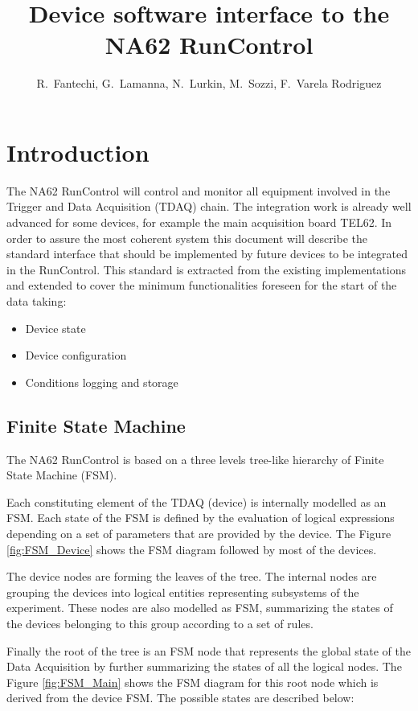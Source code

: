 \documentclass[a4paper]{article}
\title{Device software interface to the NA62 RunControl}
\author{R.~Fantechi, G.~Lamanna, N.~Lurkin, M.~Sozzi, F.~Varela Rodriguez}
\begin{document}
\maketitle

\linenumbers

\section{Introduction}
The NA62 RunControl will control and monitor all equipment involved in the Trigger and Data
Acquisition (TDAQ) chain. The integration work is already well advanced for some devices, for
example the main acquisition board TEL62\cite{biblio:TEL62}. In order to assure the most coherent system this
document will describe the standard interface that should be implemented by future devices to be
integrated in the RunControl. This standard is extracted from the existing implementations and
extended to cover the minimum functionalities foreseen for the start of the data taking:
\begin{itemize}
	\item Device state
	\item Device configuration
	\item Conditions logging and storage
\end{itemize} 

\subsection{Finite State Machine}\label{sec:FSM}
The NA62 RunControl is based on a three levels tree-like hierarchy of Finite State Machine (FSM).

Each constituting element of the TDAQ (device) is internally modelled as an FSM. Each state of the
FSM is defined by the evaluation of logical expressions depending on a set of parameters that are
provided by the device. The Figure \ref{fig:FSM_Device} shows the FSM diagram followed by most of
the devices.

The device nodes are forming the leaves of the tree. The internal nodes are grouping the devices
into logical entities representing subsystems of the experiment. These nodes are also modelled as
FSM, summarizing the states of the devices belonging to this group according to a set of rules.

Finally the root of the tree is an FSM node that represents the global state of the Data Acquisition
by further summarizing the states of all the logical nodes. The Figure \ref{fig:FSM_Main} shows the
FSM diagram for this root node which is derived from the device FSM. The possible states are
described below:
\end{document}
